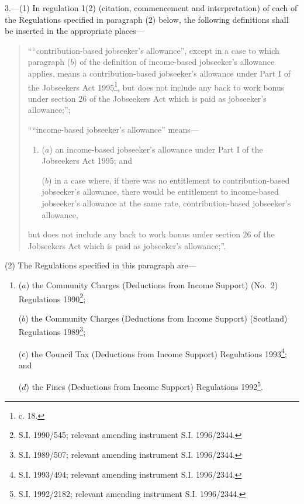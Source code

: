 \documentclass[12pt,a4paper]{article}
\begin{document}
3.---(1)  In regulation 1(2) (citation, commencement and interpretation) of each of the Regulations specified in paragraph (2) below, the following definitions shall be inserted in the appropriate places—
\begin{quotation}
    ““contribution-based jobseeker’s allowance”, except in a case to which paragraph ($b$)  of the definition of income-based jobseeker’s allowance applies, means a contribution-based jobseeker’s allowance under Part I of the Jobseekers Act 1995\footnote{ c. 18.}, but does not include any back to work bonus under section 26 of the Jobseekers Act which is paid as jobseeker’s allowance;”; 

    ““income-based jobseeker’s allowance” means—
\begin{enumerate}\item[]
    ($a$) 
    an income-based jobseeker’s allowance under Part I of the Jobseekers Act 1995; and

    ($b$) 
    in a case where, if there was no entitlement to contribution\hspace{0pt}-based jobseeker’s allowance, there would be entitlement to income-based jobseeker’s allowance at the same rate, contribution-based jobseeker’s allowance,
\end{enumerate}\item[]
    but does not include any back to work bonus under section 26 of the Jobseekers Act which is paid as jobseeker’s allowance;”. 
\end{quotation}

(2) The Regulations specified in this paragraph are—
\begin{enumerate}\item[]
($a$) the Community Charges (Deductions from Income Support) (No.\ 2) Regulations 1990\footnote{\frenchspacing S.I. 1990/545; relevant amending instrument S.I. 1996/2344.};

($b$) the Community Charges (Deductions from Income Support) (Scotland) Regulations 1989\footnote{\frenchspacing S.I. 1989/507; relevant amending instrument S.I. 1996/2344.};

($c$) the Council Tax (Deductions from Income Support) Regulations 1993\footnote{\frenchspacing S.I. 1993/494; relevant amending instrument S.I. 1996/2344.}; and

($d$) the Fines (Deductions from Income Support) Regulations 1992\footnote{\frenchspacing S.I. 1992/2182; relevant amending instrument S.I. 1996/2344.}.
\end{enumerate}
\end{document}

